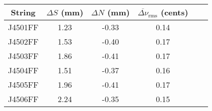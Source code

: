 \begin{tabular}{cccccc}
\toprule
String & $\Delta S$ (mm) & $\Delta N$ (mm) & $\overline{\Delta \nu}_\text{rms}$ (cents) \\
\midrule
J4501FF & 1.23 & -0.33 & 0.14 \\
J4502FF & 1.53 & -0.40 & 0.17 \\
J4503FF & 1.86 & -0.41 & 0.17 \\
J4504FF & 1.51 & -0.37 & 0.16 \\
J4505FF & 1.96 & -0.41 & 0.17 \\
J4506FF & 2.24 & -0.35 & 0.15 \\
\bottomrule
\end{tabular}

